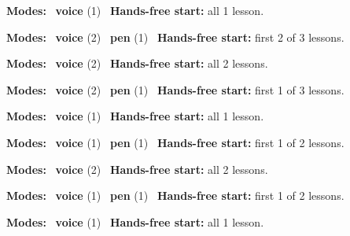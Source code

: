 \expandafter\def\csname hlchaptermodality22\endcsname{%
  {\small\noindent
    \textbf{Modes:} \hlvoicesign{}~\textbf{voice} (1)\quad
    \hlvoicesign{}~\textbf{Hands-free start:} all 1 lesson.%
    \par}\medskip
}

\expandafter\def\csname hlchaptermodality23\endcsname{%
  {\small\noindent
    \textbf{Modes:} \hlvoicesign{}~\textbf{voice} (2) \quad \hlpensign{}~\textbf{pen} (1)\quad
    \hlvoicesign{}~\textbf{Hands-free start:} first 2 of 3 lessons.%
    \par}\medskip
}

\expandafter\def\csname hlchaptermodality24\endcsname{%
  {\small\noindent
    \textbf{Modes:} \hlvoicesign{}~\textbf{voice} (2)\quad
    \hlvoicesign{}~\textbf{Hands-free start:} all 2 lessons.%
    \par}\medskip
}

\expandafter\def\csname hlchaptermodality25\endcsname{%
  {\small\noindent
    \textbf{Modes:} \hlvoicesign{}~\textbf{voice} (2) \quad \hlpensign{}~\textbf{pen} (1)\quad
    \hlvoicesign{}~\textbf{Hands-free start:} first 1 of 3 lessons.%
    \par}\medskip
}

\expandafter\def\csname hlchaptermodality26\endcsname{%
  {\small\noindent
    \textbf{Modes:} \hlvoicesign{}~\textbf{voice} (1)\quad
    \hlvoicesign{}~\textbf{Hands-free start:} all 1 lesson.%
    \par}\medskip
}

\expandafter\def\csname hlchaptermodality27\endcsname{%
  {\small\noindent
    \textbf{Modes:} \hlvoicesign{}~\textbf{voice} (1) \quad \hlpensign{}~\textbf{pen} (1)\quad
    \hlvoicesign{}~\textbf{Hands-free start:} first 1 of 2 lessons.%
    \par}\medskip
}

\expandafter\def\csname hlchaptermodality28\endcsname{%
  {\small\noindent
    \textbf{Modes:} \hlvoicesign{}~\textbf{voice} (2)\quad
    \hlvoicesign{}~\textbf{Hands-free start:} all 2 lessons.%
    \par}\medskip
}

\expandafter\def\csname hlchaptermodality29\endcsname{%
  {\small\noindent
    \textbf{Modes:} \hlvoicesign{}~\textbf{voice} (1) \quad \hlpensign{}~\textbf{pen} (1)\quad
    \hlvoicesign{}~\textbf{Hands-free start:} first 1 of 2 lessons.%
    \par}\medskip
}

\expandafter\def\csname hlchaptermodality30\endcsname{%
  {\small\noindent
    \textbf{Modes:} \hlvoicesign{}~\textbf{voice} (1)\quad
    \hlvoicesign{}~\textbf{Hands-free start:} all 1 lesson.%
    \par}\medskip
}

